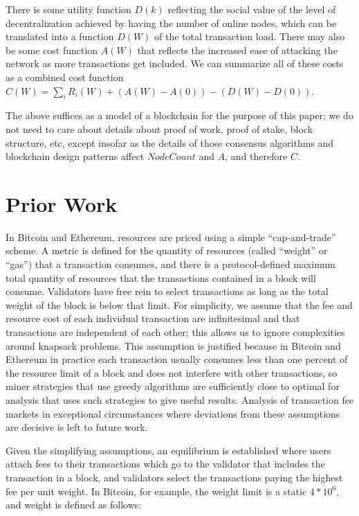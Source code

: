 \documentclass[12pt, final]{article}
\begin{document}
There is some utility function $D(k)$ reflecting the social value of the level of decentralization achieved by having the number of online nodes, which can be translated into a function $D(W)$ of the total transaction load. There may also be some cost function $A(W)$ that reflects the increased ease of attacking the network as more transactions get included. We can summarize all of these costs as a combined cost function $C(W) = \sum_i R_i(W) + (A(W) - A(0)) - (D(W) - D(0))$.

The above suffices as a model of a blockchain for the purpose of this paper; we do not need to care about details about proof of work, proof of stake, block structure, etc, except insofar as the details of those consensus algorithms and blockchain design patterns affect $NodeCount$ and $A$, and therefore $C$.

\section{Prior Work}

In Bitcoin and Ethereum, resources are priced using a simple ``cap-and-trade'' scheme. A metric is defined for the quantity of resources (called ``weight'' or ``gas'') that a transaction consumes, and there is a protocol-defined maximum total quantity of resources that the transactions contained in a block will consume. Validators have free rein to select transactions as long as the total weight of the block is below that limit. For simplicity, we assume that the fee and resource cost of each individual transaction are infinitesimal and that transactions are independent of each other; this allows us to ignore complexities around knapsack problems. This assumption is justified because in Bitcoin and Ethereum in practice each transaction usually consumes less than one percent of the resource limit of a block and does not interfere with other transactions, so miner strategies that use greedy algorithms are sufficiently close to optimal for analysis that uses such strategies to give useful results. Analysis of transaction fee markets in exceptional circumstances where deviations from these assumptions are decisive is left to future work.

Given the simplifying assumptions, an equilibrium is established where users attach fees to their transactions which go to the validator that includes the transaction in a block, and validators select the transactions paying the highest fee per unit weight. In Bitcoin, for example, the weight limit is a static $4 *10^6$, and weight is defined as follows\cite{weightunits}:
\end{document}
